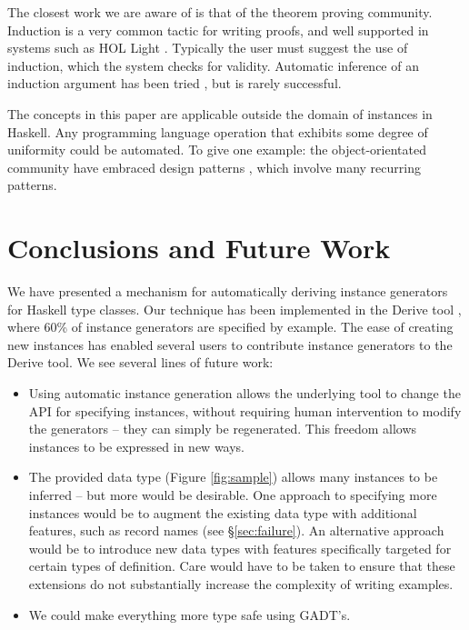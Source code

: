 \documentclass[preprint,draft]{sigplanconf}
\begin{document}
The closest work we are aware of is that of the theorem proving community. Induction is a very common tactic for writing proofs, and well supported in systems such as HOL Light \cite{hol_light}. Typically the user must suggest the use of induction, which the system checks for validity. Automatic inference of an induction argument has been tried \cite{mintchev:reasoning}, but is rarely successful.

The concepts in this paper are applicable outside the domain of instances in Haskell. Any programming language operation that exhibits some degree of uniformity could be automated. To give one example: the object-orientated community have embraced design patterns \cite{design_patterns}, which involve many recurring patterns.

\section{Conclusions and Future Work}
\label{sec:conclusion}

We have presented a mechanism for automatically deriving instance generators for Haskell type classes. Our technique has been implemented in the Derive tool \cite{derive}, where 60\% of instance generators are specified by example. The ease of creating new instances has enabled several users to contribute instance generators to the Derive tool. We see several lines of future work:

\begin{itemize}
\item Using automatic instance generation allows the underlying tool to change the API for specifying instances, without requiring human intervention to modify the generators -- they can simply be regenerated. This freedom allows instances to be expressed in new ways.
\item The provided data type (Figure \ref{fig:sample}) allows many instances to be inferred -- but more would be desirable. One approach to specifying more instances would be to augment the existing data type with additional features, such as record names (see \S\ref{sec:failure}). An alternative approach would be to introduce new data types with features specifically targeted for certain types of definition. Care would have to be taken to ensure that these extensions do not substantially increase the complexity of writing examples.
\item We could make everything more type safe using GADT's.
\end{itemize}
\end{document}
